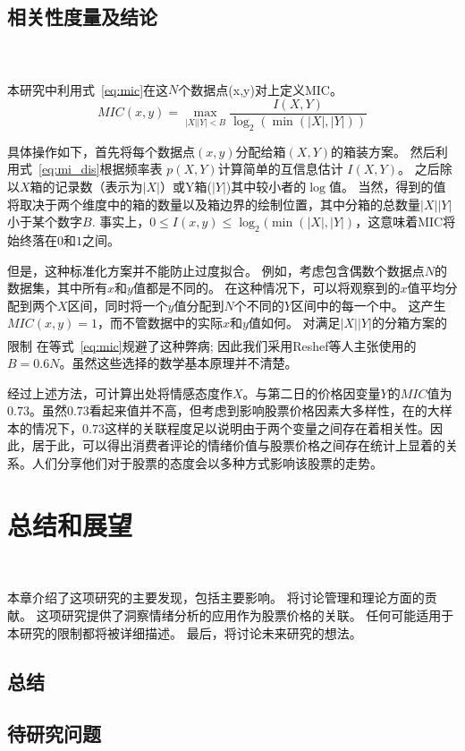 \documentclass[cs4size,a4paper]{ctexart}
\numberwithin{equation}{section}
\numberwithin{table}{section}
\numberwithin{figure}{section}
\newcommand{\upcite}[1]{\textsuperscript{\textsuperscript{\cite{#1}}}}%
\begin{document}
\subsection{相关性度量及结论}~\label{subsec:sum}

本研究中利用式~\ref{eq:mic}在这$N$个数据点(x,y)对上定义MIC\upcite{reshef2011detecting}。
\begin{equation}\label{eq:mic}
  MIC(x,y) = \max_{ \left| X \right| \left| Y \right|<B}\frac{I(X,Y)}{\log_2 (\min( \left| X \right|, \left| Y \right|))}
\end{equation}

具体操作如下，首先将每个数据点$(x,y)$分配给箱$(X,Y)$的箱装方案。 然后利用式~\ref{eq:mi_dis}根据频率表  $p(X,Y)$计算简单的互信息估计 $I(X,Y)$。  之后除以$X$箱的记录数（表示为$|X|$）或Y箱($|Y|$)其中较小者的$\log$值。 当然，得到的值将取决于两个维度中的箱的数量以及箱边界的绘制位置，其中分箱的总数量$|X||Y|$小于某个数字$B$.
事实上，$0 \leq I(x,y) \leq \log_{2}(\min(|X|,|Y|)$，这意味着MIC将始终落在$0$和$1$之间。

但是，这种标准化方案并不能防止过度拟合。 例如，考虑包含偶数个数据点$N$的数据集，其中所有$x$和$y$值都是不同的。 在这种情况下，可以将观察到的$x$值平均分配到两个$X$区间，同时将一个$y$值分配到$N$个不同的$Y$区间中的每一个中。 这产生$MIC(x, y) = 1$，而不管数据中的实际$x$和$y$值如何。 对满足$|X ||Y|$的分箱方案的限制 在等式~\ref{eq:mic}规避了这种弊病; 因此我们采用Reshef等人\upcite{reshef2011detecting}主张使用的$B = 0.6N$。虽然这些选择的数学基本原理并不清楚。

经过上述方法，可计算出处将情感态度作$X$。与第二日的价格因变量$Y$的$MIC$值为$0.73$。虽然$0.73$看起来值并不高，但考虑到影响股票价格因素大多样性，在的大样本的情况下，$0.73$这样的关联程度足以说明由于两个变量之间存在着相关性。因此，居于此，可以得出消费者评论的情绪价值与股票价格之间存在统计上显着的关系。人们分享他们对于股票的态度会以多种方式影响该股票的走势。


\section{总结和展望}~\label{总结}

本章介绍了这项研究的主要发现，包括主要影响。 将讨论管理和理论方面的贡献。 这项研究提供了洞察情绪分析的应用作为股票价格的关联。 任何可能适用于本研究的限制都将被详细描述。 最后，将讨论未来研究的想法。

\subsection{总结}

\subsection{待研究问题}~\label{待研究问题}


\newpage
{}
\nocite{*}
%


%
\end{document}
